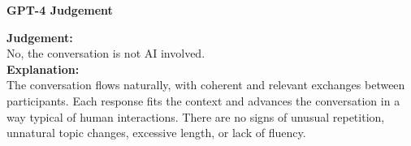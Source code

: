\documentclass[25pt, a0paper, portrait]{tikzposter}
\begin{document}
\begin{columns}
{\begin{center}
\begin{minipage}[t]{0.485\linewidth}
\begin{caseouterbox}
						
						\begin{casejudgebox}
							\begin{center}
								\textcolor{CaseGreen}{\textbf{GPT-4 Judgement}}
							\end{center}
							\textcolor{CaseBlue}{\textbf{Judgement:}}\\
							No, the conversation is not AI involved.\\
							\textcolor{CaseBlue}{\textbf{Explanation:}}\\
							The conversation flows naturally, with coherent and relevant exchanges between participants. Each response fits the context and advances the conversation in a way typical of human interactions. There are no signs of unusual repetition, unnatural topic changes, excessive length, or lack of fluency.
						\end{casejudgebox}
					\end{caseouterbox}
				\end{minipage}
			\end{center}
		}
	\end{columns}
\end{document}
